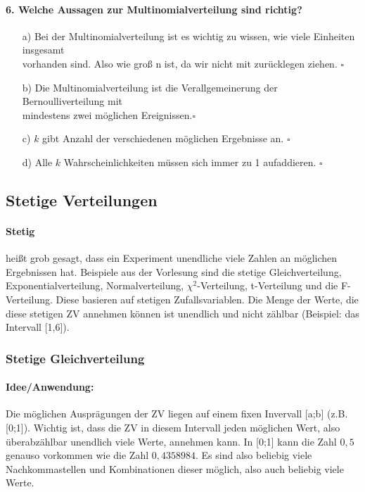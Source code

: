 \documentclass[a4paper]{article}
\begin{document}
\paragraph{6. Welche Aussagen zur Multinomialverteilung sind richtig?}
\begin{itemize}
    \item[a)] Bei der Multinomialverteilung ist es wichtig zu wissen, wie viele Einheiten insgesamt\\ vorhanden sind. Also wie groß n ist, da wir nicht mit zurücklegen ziehen. \hfill $\square$
    \item[b)] Die Multinomialverteilung ist die Verallgemeinerung der Bernoulliverteilung mit\\ mindestens zwei möglichen Ereignissen.\hfill $\square$
    \item[c)] $k$ gibt Anzahl der verschiedenen möglichen Ergebnisse an. \hfill $\square$
    \item[d)] Alle $k$ Wahrscheinlichkeiten müssen sich immer zu 1 aufaddieren. \hfill $\square$
\end{itemize}
\clearpage


\subsection{Stetige Verteilungen} \label{sec:contdistr}

\paragraph{Stetig} heißt grob gesagt, dass ein Experiment unendliche viele Zahlen an möglichen Ergebnissen hat. Beispiele aus der Vorlesung sind die stetige Gleichverteilung, Exponentialverteilung, Normalverteilung, $\chi^2$-Verteilung, t-Verteilung und die F-Verteilung. Diese basieren auf stetigen Zufallsvariablen. Die Menge der Werte, die diese stetigen ZV annehmen können ist unendlich und nicht zählbar (Beispiel: das Intervall [1,6]). 

\subsubsection{Stetige Gleichverteilung}\label{sec:Uni}

\paragraph{Idee/Anwendung:} Die möglichen Ausprägungen der ZV liegen auf einem fixen Invervall [a;b] (z.B. [0;1]). Wichtig ist, dass die ZV in diesem Intervall jeden möglichen Wert, also überabzählbar unendlich viele Werte, annehmen kann. In [0;1] kann die Zahl $0,5$ genauso vorkommen wie die Zahl $0,4358984$. Es sind also beliebig viele Nachkommastellen und Kombinationen dieser möglich, also auch beliebig viele Werte. \\
\end{document}
